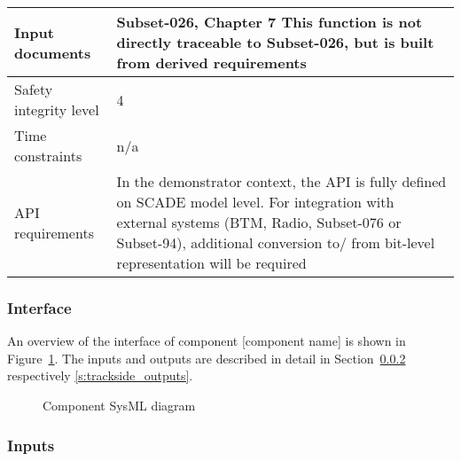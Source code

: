 \begin{longtable}{p{}p{}}
\\

\midrule
Input documents	& 
Subset-026, Chapter 7\newline
\newline
This function is not directly traceable to Subset-026, but is built from derived requirements\\
\midrule
Safety integrity level		& 4 \\
\midrule
Time constraints		& n/a  \\
\midrule
API requirements 		& In the demonstrator context, the API is fully defined on SCADE model level. For integration with external systems (BTM, Radio, Subset-076 or Subset-94), additional conversion to/ from bit-level representation will be required\\
\bottomrule
\end{longtable}


\subsubsection{Interface}

An overview of the interface of component [component name] is shown in Figure~\ref{f:trackside_interface}. The inputs and outputs are described in detail in Section~\ref{s:trackside_inputs} respectively \ref{s:trackside_outputs}.

\begin{figure}
\center
{}
\caption{Component SysML diagram}\label{f:trackside_interface}
\end{figure}



\subsubsection{Inputs}\label{s:trackside_inputs}

